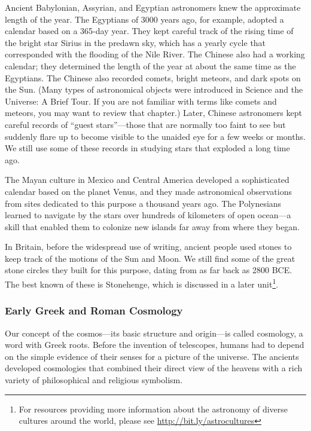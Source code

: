 \documentclass[../../main-astronomy.tex]{subfiles}
\begin{document}
Ancient Babylonian, Assyrian, and Egyptian astronomers knew the approximate length of the year. The Egyptians of 3000 years ago, for example, adopted a calendar based on a 365-day year. They kept careful track of the rising time of the bright star Sirius in the predawn sky, which has a yearly cycle that corresponded with the flooding of the Nile River. The Chinese also had a working calendar; they determined the length of the year at about the same time as the Egyptians. The Chinese also recorded comets, bright meteors, and dark spots on the Sun. (Many types of astronomical objects were introduced in Science and the Universe: A Brief Tour. If you are not familiar with terms like comets and meteors, you may want to review that chapter.) Later, Chinese astronomers kept careful records of ``guest stars''---those that are normally too faint to see but suddenly flare up to become visible to the unaided eye for a few weeks or months. We still use some of these records in studying stars that exploded a long time ago.

\vspace{1em}

The Mayan culture in Mexico and Central America developed a sophisticated calendar based on the planet Venus, and they made astronomical observations from sites dedicated to this purpose a thousand years ago. The Polynesians learned to navigate by the stars over hundreds of kilometers of open ocean---a skill that enabled them to colonize new islands far away from where they began.

\vspace{1em}

In Britain, before the widespread use of writing, ancient people used stones to keep track of the motions of the Sun and Moon. We still find some of the great stone circles they built for this purpose, dating from as far back as 2800 BCE. The best known of these is Stonehenge, which is discussed in a later unit\footnote{For resources providing more information about the astronomy of diverse cultures around the world, please see \href{http://bit.ly/astrocultures}{http://bit.ly/astrocultures}}.

\subsubsection*{Early Greek and Roman Cosmology}

Our concept of the cosmos---its basic structure and origin---is called \gls{cosmology}, a word with Greek roots. Before the invention of telescopes, humans had to depend on the simple evidence of their senses for a picture of the universe. The ancients developed cosmologies that combined their direct view of the heavens with a rich variety of philosophical and religious symbolism.
\end{document}
